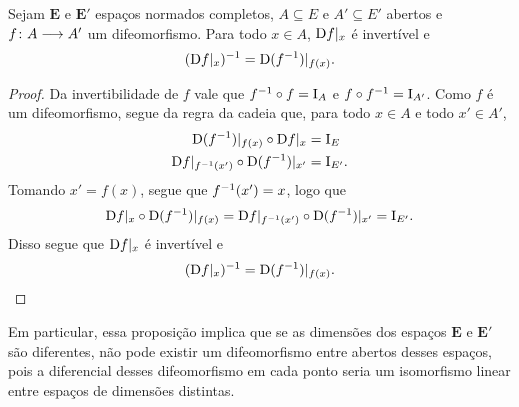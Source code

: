 \begin{proposition}
\label{prop:invertibilidade.diferencial.difeomorfismo}
Sejam $\bm E$ e $\bm E'$ espaços normados completos, $A \subseteq E$ e $A' \subseteq E'$ abertos e $f\colon \allowbreak A \longrightarrow A'$ um difeomorfismo. Para todo $x \in A$, $\mathrm{D} f|_x$ é invertível e
	\begin{equation*}
	(\mathrm{D} f|_{x})^{-1} = \mathrm{D} (f^{-1})|_{f(x)}.
	\end{equation*}
\end{proposition}
\begin{proof}
Da invertibilidade de $f$ vale que $f^{-1} \circ f = \mathrm{I}_{A}$ e $f \circ f^{-1} = \mathrm{I}_{A'}$. Como $f$ é um difeomorfismo, segue da regra da cadeia que, para todo $x \in A$ e todo $x' \in A'$,
	\begin{align*}
	\mathrm{D} (f^{-1})|_{f(x)} \circ \mathrm{D} f|_x &= \mathrm{I}_{E} \\
	\mathrm{D} f|_{f^{-1}(x')} \circ \mathrm{D} (f^{-1})|_{x'} &= \mathrm{I}_{E'}.
	\end{align*}
Tomando $x'=f(x)$, segue que $f^{-1}(x')=x$, logo que
	\begin{equation*}
	\mathrm{D} f|_{x} \circ \mathrm{D} (f^{-1})|_{f(x)} = \mathrm{D} f|_{f^{-1}(x')} \circ \mathrm{D} (f^{-1})|_{x'} = \mathrm{I}_{E'}.
	\end{equation*}
Disso segue que $\mathrm{D} f|_x$ é invertível e
	\begin{equation*}
	(\mathrm{D} f|_{x})^{-1} = \mathrm{D} (f^{-1})|_{f(x)}.
	\qedhere
	\end{equation*}
\end{proof}

Em particular, essa proposição implica que se as dimensões dos espaços $\bm E$ e $\bm E'$ são diferentes, não pode existir um difeomorfismo entre abertos desses espaços, pois a diferencial desses difeomorfismo em cada ponto seria um isomorfismo linear entre espaços de dimensões distintas.


